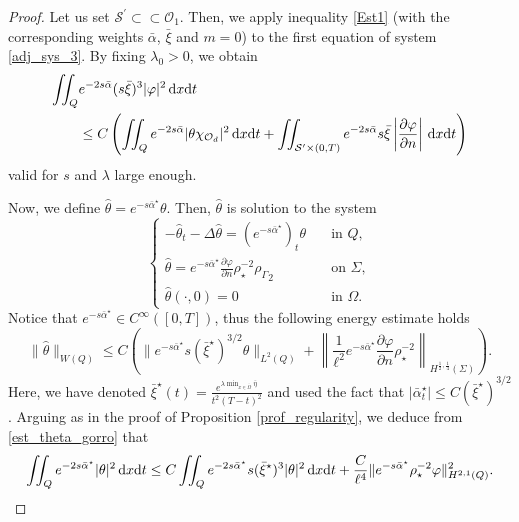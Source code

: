 \documentclass{dcds-bOF}
\theoremstyle{definition}
\def\csbd{\rho_{\Gamma}}
\def\dx{\,\textnormal{d}x}
\def\dt{\textnormal{d}t}
\begin{document}
\begin{proof}
Let us set $\mathcal S^\prime\subset\subset \mathcal O_1$. Then, we apply inequality \eqref{Est1} (with the corresponding weights $\bar\alpha$, $\bar\xi$ and $m=0$) to the first equation of system \eqref{adj_sys_3}. By fixing $\lambda_0>0$, we obtain
%
\begin{equation}\label{car_init_sec3}
\begin{split}
\iint_Q & e^{-2s\bar\alpha}(s\bar\xi)^3|\varphi|^2\dx\dt\\
&\leq C\left(\iint_{Q}e^{-2s\bar\alpha}|\theta\chi_{\mathcal O_d}|^2\dx\dt+\iint_{\mathcal S^\prime\times(0,T)}e^{-2s\bar\alpha}s\bar\xi\left|\frac{\partial \varphi}{\partial n}\right|\dx\dt\right)
\end{split}
\end{equation}
%
valid for $s$ and $\lambda$ large enough.

Now, we define $\widehat{\theta}=e^{-s\bar\alpha^\star}\theta$. Then, $\widehat{\theta}$ is solution to the system
%
\begin{equation*}%
\begin{cases}
-\widehat\theta_t-\Delta \widehat\theta=(e^{-s\bar\alpha^\star})_t\theta &\quad \text{in } Q, \\
\widehat\theta=e^{-s\bar\alpha^\star}\frac{\partial\varphi}{\partial n}\rho_\star^{-2}{\csbd}_{2} &\quad \text{on } \Sigma, \\
\widehat{\theta}(\cdot,0)=0 &\quad\text{in } \Omega.
\end{cases}
\end{equation*}
%
Notice that $e^{-s\bar\alpha^\star}\in C^{\infty}([0,T])$, thus the following energy estimate holds
%
\begin{equation}\label{est_theta_gorro}
\|\widehat\theta\|_{W(Q)}\leq C\left(\|e^{-s\bar\alpha^\star}s(\bar\xi^\star)^{3/2}\theta\|_{L^2(Q)}+\left\|\frac{1}{\ell^2}e^{-s\bar\alpha^\star}\frac{\partial\varphi}{\partial n}\rho_\star^{-2}\right\|_{H^{\frac12,\frac14}(\Sigma)}\right).
\end{equation}
%
Here, we have denoted $\bar{\xi}^\star(t)=\frac{e^{\lambda\min_{x\in \overline\Omega}\bar\eta}}{t^2(T-t)^2}$ and used the fact that $|\bar\alpha^\star_t|\leq C({\bar\xi}^\star)^{3/2}$ . Arguing as in the proof of Proposition \ref{prof_regularity}, we deduce from \eqref{est_theta_gorro} that
%
\begin{equation}\label{est_bar_theta}
\iint_{Q}e^{-2s\bar\alpha^\star}|\theta|^2\dx\dt \leq C\iint_{Q}e^{-2s\bar\alpha^\star}s(\bar\xi^\star)^3|\theta|^2\dx\dt+\frac{C}{\ell^4}\|e^{-s\bar\alpha^\star}\rho_\star^{-2}\varphi\|^2_{H^{2,1}(Q)}.
\end{equation}
%


\end{proof}
\end{document}

